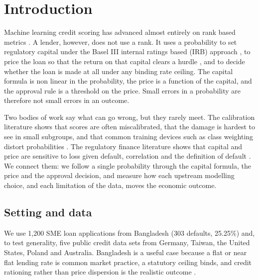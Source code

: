 \documentclass[11pt,a4paper]{article}
\begin{document}
\begin{abstract}
\noindent\textbf{Keywords:} credit scoring; probability calibration; Basel III IRB; risk adjusted return on capital; SME finance; selection bias; emerging markets; Bangladesh.
\end{abstract}

\section{Introduction}
Machine learning credit scoring has advanced almost entirely on rank based metrics \citep{Khandani2010,Lessmann2015}. A lender, however, does not use a rank. It uses a probability to set regulatory capital under the Basel III internal ratings based (IRB) approach \citep{BCBS2017}, to price the loan so that the return on that capital clears a hurdle \citep{Repullo2004,Stoughton2007}, and to decide whether the loan is made at all under any binding rate ceiling. The capital formula is non linear in the probability, the price is a function of the capital, and the approval rule is a threshold on the price. Small errors in a probability are therefore not small errors in an outcome.

Two bodies of work say what can go wrong, but they rarely meet. The calibration literature shows that scores are often miscalibrated, that the damage is hardest to see in small subgroups, and that common training devices such as class weighting distort probabilities \citep{Guo2017,VanCalster2019,Roelofs2022,VanDenGoorbergh2022}. The regulatory finance literature shows that capital and price are sensitive to loss given default, correlation and the definition of default \citep{Tarashev2010,Witzany2008,Altman2005}. We connect them: we follow a single probability through the capital formula, the price and the approval decision, and measure how each upstream modelling choice, and each limitation of the data, moves the economic outcome.

\subsection{Setting and data}
We use 1{,}200 SME loan applications from Bangladesh (303 defaults, 25.25\%) and, to test generality, five public credit data sets from Germany, Taiwan, the United States, Poland and Australia. Bangladesh is a useful case because a flat or near flat lending rate is common market practice, a statutory ceiling binds, and credit rationing rather than price dispersion is the realistic outcome \citep{Beck2006,Berger2006}.
\end{document}
